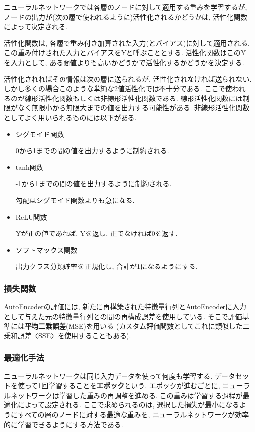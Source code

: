 \documentclass[dvipdfmx]{jsarticle}
\begin{document}
ニューラルネットワークでは各層のノードに対して適用する重みを学習するが, ノードの出力が(次の層で使われるように)活性化されるかどうかは, 活性化関数によって決定される.

活性化関数は, 各層で重み付き加算された入力(とバイアス)に対して適用される.
この重み付けされた入力とバイアスをYと呼ぶこととする.
活性化関数はこのYを入力として, ある閾値よりも高いかどうかで活性化するかどうかを決定する.

活性化されればその情報は次の層に送られるが, 活性化されなければ送られない.
しかし多くの場合このような単純な2値活性化では不十分である.
ここで使われるのが線形活性化関数もしくは非線形活性化関数である.
線形活性化関数には制限がなく無限小から無限大までの値を出力する可能性がある.
非線形活性化関数としてよく用いられるものには以下がある.
\begin{itemize}
    \item シグモイド関数

    0から1までの間の値を出力するように制約される.

    \item tanh関数

    -1から1までの間の値を出力するように制約される.
    
    勾配はシグモイド関数よりも急になる.

    \item ReLU関数

    Yが正の値であれば, Yを返し, 正でなければ0を返す.

    \item ソフトマックス関数

    出力クラス分類確率を正規化し, 合計が1になるようにする.
\end{itemize}


\subsubsection{損失関数}
AutoEncoderの評価には, 新たに再構築された特徴量行列とAutoEncoderに入力として与えた元の特徴量行列との間の再構成誤差を使用している.
そこで評価基準には\textbf{平均二乗誤差}(MSE)を用いる
(カスタム評価関数としてこれに類似した二乗和誤差〈SSE〉を使用することもある).


\subsubsection{最適化手法}
ニューラルネットワークは同じ入力データを使って何度も学習する.
データセットを使って1回学習することを\textbf{エポック}という.
エポックが進むごとに, ニューラルネットワークは学習した重みの再調整を進める.
この重みは学習する過程が最適化によって設定される.
ここで求められるのは, 選択した損失が最小になるようにすべての層のノードに対する最適な重みを, ニューラルネットワークが効率的に学習できるようにする方法である.
\end{document}
